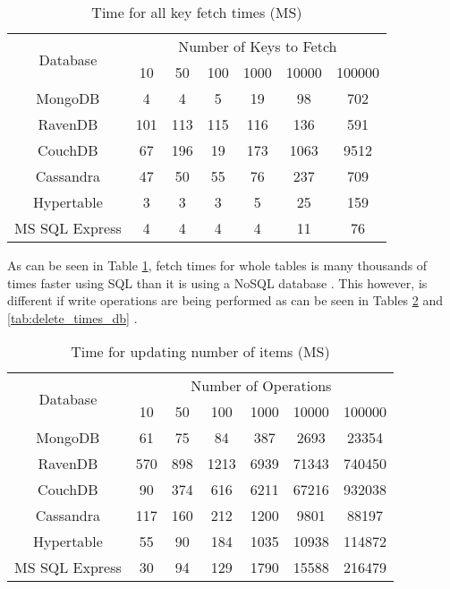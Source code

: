 \begin{table}[ht]
\centering
\begin{tabular}{c|cccccc}
\multirow{2}{*}{Database} & \multicolumn{6}{c}{Number of Keys to Fetch} \\
& 10 & 50 & 100 & 1000 & 10000 & 100000 \\
\hline
MongoDB & 4 & 4 & 5 & 19 & 98 & 702 \\
RavenDB & 101 & 113 & 115 & 116 & 136 & 591 \\
CouchDB & 67 & 196 & 19 & 173 & 1063 & 9512 \\
Cassandra & 47 & 50 & 55 & 76 & 237 & 709 \\
Hypertable & 3 & 3 & 3 & 5 & 25 & 159 \\
MS SQL Express & 4 & 4 & 4 & 4 & 11 & 76 \\
\end{tabular}
\caption{Time for all key fetch times (MS) \cite{Li_Manoharan_2013}}
\label{tab:fetch_times_db}
\end{table}

As can be seen in Table \ref{tab:fetch_times_db}, fetch times for whole tables is many thousands of times faster using SQL than it is using a NoSQL database \cite{Li_Manoharan_2013}. This however, is different if write operations are being performed as can be seen in Tables \ref{tab:write_times_db} and \ref{tab:delete_times_db} \cite{Li_Manoharan_2013}.

\begin{table}[ht]
\centering
\begin{tabular}{c|cccccc}
\multirow{2}{*}{Database} & \multicolumn{6}{c}{Number of Operations} \\
& 10 & 50 & 100 & 1000 & 10000 & 100000 \\
\hline
MongoDB & 61 & 75 & 84 & 387 & 2693 & 23354 \\
RavenDB & 570 & 898 & 1213 & 6939 & 71343 & 740450 \\
CouchDB & 90 & 374 & 616 & 6211 & 67216 & 932038 \\
Cassandra & 117 & 160 & 212 & 1200 & 9801 & 88197 \\
Hypertable & 55 & 90 & 184 & 1035 & 10938 & 114872 \\
MS SQL Express & 30 & 94 & 129 & 1790 & 15588 & 216479 \\
\end{tabular}
\caption{Time for updating number of items (MS) \cite{Li_Manoharan_2013}}
\label{tab:write_times_db}
\end{table}


